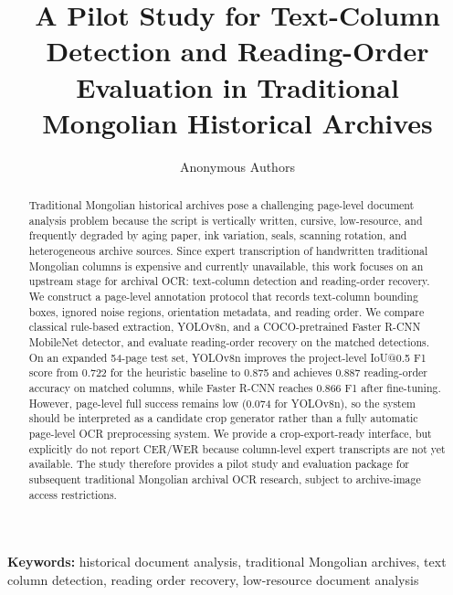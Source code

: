 \documentclass[12pt]{article}
\begin{document}
\title{\Large\bfseries A Pilot Study for Text-Column Detection and Reading-Order Evaluation in Traditional Mongolian Historical Archives}

\author{Anonymous Authors}
\date{}

\maketitle

\begin{abstract}
Traditional Mongolian historical archives pose a challenging page-level document analysis problem because the script is vertically written, cursive, low-resource, and frequently degraded by aging paper, ink variation, seals, scanning rotation, and heterogeneous archive sources. Since expert transcription of handwritten traditional Mongolian columns is expensive and currently unavailable, this work focuses on an upstream stage for archival OCR: text-column detection and reading-order recovery. We construct a page-level annotation protocol that records text-column bounding boxes, ignored noise regions, orientation metadata, and reading order. We compare classical rule-based extraction, YOLOv8n, and a COCO-pretrained Faster R-CNN MobileNet detector, and evaluate reading-order recovery on the matched detections. On an expanded 54-page test set, YOLOv8n improves the project-level IoU@0.5 F1 score from 0.722 for the heuristic baseline to 0.875 and achieves 0.887 reading-order accuracy on matched columns, while Faster R-CNN reaches 0.866 F1 after fine-tuning. However, page-level full success remains low (0.074 for YOLOv8n), so the system should be interpreted as a candidate crop generator rather than a fully automatic page-level OCR preprocessing system. We provide a crop-export-ready interface, but explicitly do not report CER/WER because column-level expert transcripts are not yet available. The study therefore provides a pilot study and evaluation package for subsequent traditional Mongolian archival OCR research, subject to archive-image access restrictions.
\end{abstract}

\noindent\textbf{Keywords:} historical document analysis, traditional Mongolian archives, text column detection, reading order recovery, low-resource document analysis

\maketitle
\end{document}

